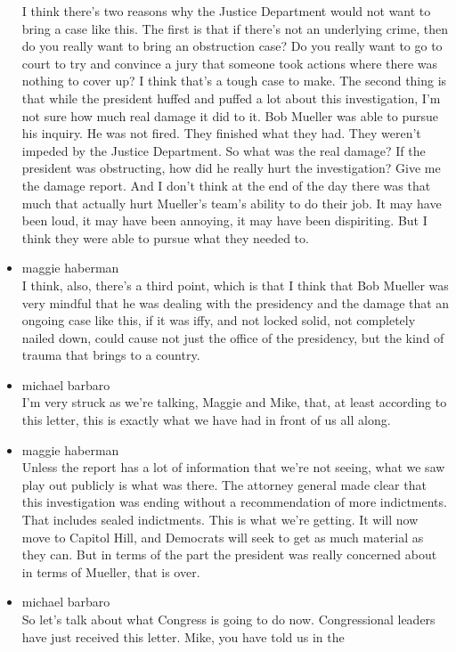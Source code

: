 \begin{itemize}
  I think there's two reasons why the Justice Department would not want
  to bring a case like this. The first is that if there's not an
  underlying crime, then do you really want to bring an obstruction
  case? Do you really want to go to court to try and convince a jury
  that someone took actions where there was nothing to cover up? I think
  that's a tough case to make. The second thing is that while the
  president huffed and puffed a lot about this investigation, I'm not
  sure how much real damage it did to it. Bob Mueller was able to pursue
  his inquiry. He was not fired. They finished what they had. They
  weren't impeded by the Justice Department. So what was the real
  damage? If the president was obstructing, how did he really hurt the
  investigation? Give me the damage report. And I don't think at the end
  of the day there was that much that actually hurt Mueller's team's
  ability to do their job. It may have been loud, it may have been
  annoying, it may have been dispiriting. But I think they were able to
  pursue what they needed to.
\item
  maggie haberman\\
  I think, also, there's a third point, which is that I think that Bob
  Mueller was very mindful that he was dealing with the presidency and
  the damage that an ongoing case like this, if it was iffy, and not
  locked solid, not completely nailed down, could cause not just the
  office of the presidency, but the kind of trauma that brings to a
  country.
\item
  michael barbaro\\
  I'm very struck as we're talking, Maggie and Mike, that, at least
  according to this letter, this is exactly what we have had in front of
  us all along.
\item
  maggie haberman\\
  Unless the report has a lot of information that we're not seeing, what
  we saw play out publicly is what was there. The attorney general made
  clear that this investigation was ending without a recommendation of
  more indictments. That includes sealed indictments. This is what we're
  getting. It will now move to Capitol Hill, and Democrats will seek to
  get as much material as they can. But in terms of the part the
  president was really concerned about in terms of Mueller, that is
  over.
\item
  michael barbaro\\
  So let's talk about what Congress is going to do now. Congressional
  leaders have just received this letter. Mike, you have told us in the

\end{itemize}
